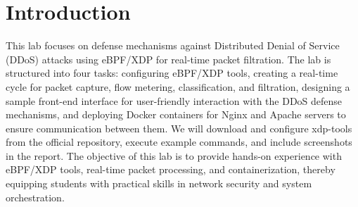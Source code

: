 \chapter{Introduction}\label{chap:introduction}

This lab focuses on defense mechanisms against Distributed Denial of Service (DDoS) attacks using eBPF/XDP for real-time packet filtration. 
The lab is structured into four tasks: configuring eBPF/XDP tools, creating a real-time cycle for packet capture, flow metering, 
classification, and filtration, designing a sample front-end interface for user-friendly interaction with the DDoS defense mechanisms, 
and deploying Docker containers for Nginx and Apache servers to ensure communication between them. 
We will download and configure xdp-tools from the official repository, execute example commands, and include screenshots in the report. 
The objective of this lab is to provide hands-on experience with eBPF/XDP tools, real-time packet processing, and containerization, thereby equipping students with practical skills in network security and system orchestration.
